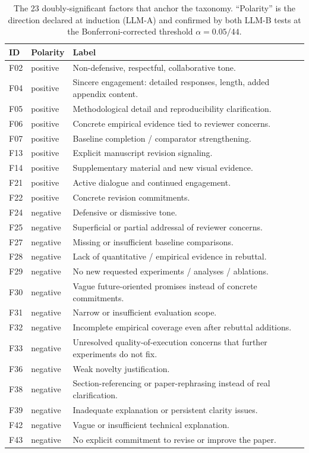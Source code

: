 \documentclass{article}
\begin{document}
\begin{table}[htbp]
  \centering
  \caption{The 23 doubly-significant factors that anchor the taxonomy. ``Polarity'' is the direction declared at induction (LLM-A) and confirmed by both LLM-B tests at the Bonferroni-corrected threshold $\alpha = 0.05 / 44$.}
  \label{tab:taxonomy-core}
  \small
  \begin{tabular}{p{0.8cm} p{1.5cm} p{11cm}}
    \toprule
    \textbf{ID} & \textbf{Polarity} & \textbf{Label} \\
    \midrule
    F02 & positive & Non-defensive, respectful, collaborative tone. \\
    F04 & positive & Sincere engagement: detailed responses, length, added appendix content. \\
    F05 & positive & Methodological detail and reproducibility clarification. \\
    F06 & positive & Concrete empirical evidence tied to reviewer concerns. \\
    F07 & positive & Baseline completion / comparator strengthening. \\
    F13 & positive & Explicit manuscript revision signaling. \\
    F14 & positive & Supplementary material and new visual evidence. \\
    F21 & positive & Active dialogue and continued engagement. \\
    F22 & positive & Concrete revision commitments. \\
    \midrule
    F24 & negative & Defensive or dismissive tone. \\
    F25 & negative & Superficial or partial addressal of reviewer concerns. \\
    F27 & negative & Missing or insufficient baseline comparisons. \\
    F28 & negative & Lack of quantitative / empirical evidence in rebuttal. \\
    F29 & negative & No new requested experiments / analyses / ablations. \\
    F30 & negative & Vague future-oriented promises instead of concrete commitments. \\
    F31 & negative & Narrow or insufficient evaluation scope. \\
    F32 & negative & Incomplete empirical coverage even after rebuttal additions. \\
    F33 & negative & Unresolved quality-of-execution concerns that further experiments do not fix. \\
    F36 & negative & Weak novelty justification. \\
    F38 & negative & Section-referencing or paper-rephrasing instead of real clarification. \\
    F39 & negative & Inadequate explanation or persistent clarity issues. \\
    F42 & negative & Vague or insufficient technical explanation. \\
    F43 & negative & No explicit commitment to revise or improve the paper. \\
    \bottomrule
  \end{tabular}
\end{table}
\end{document}
